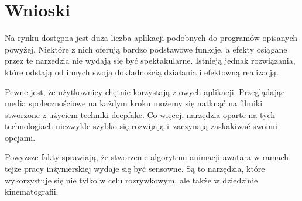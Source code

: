 
\section{Wnioski}
Na rynku dostępna jest duża liczba aplikacji podobnych do programów opisanych powyżej. Niektóre z nich oferują bardzo podstawowe funkcje, a efekty osiągane przez te narzędzia nie wydają się być spektakularne. Istnieją jednak rozwiązania, które odstają od innych swoją dokładnością działania i efektowną realizacją. 

Pewne jest, że użytkownicy chętnie korzystają z owych aplikacji. Przeglądając media społecznościowe na każdym kroku możemy się natknąć na filmiki stworzone z użyciem techniki deepfake. Co więcej, narzędzia oparte na tych technologiach niezwykle szybko się rozwijają i~zaczynają zaskakiwać swoimi opcjami.

Powyższe fakty sprawiają, że stworzenie algorytmu animacji awatara w ramach tejże pracy inżynierskiej wydaje się być sensowne. Są to narzędzia, które wykorzystuje się nie tylko w celu rozrywkowym, ale także w dziedzinie kinematografii. 


